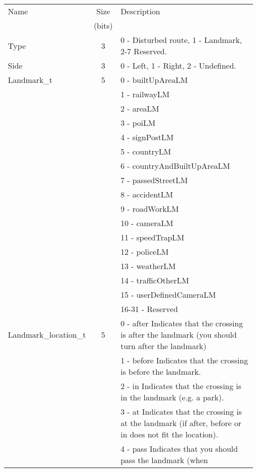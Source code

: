 \documentclass[a4paper]{article}
\begin{document}
\begin{centering}
\begin{tabular}{|l|c|p{7cm}|}
\hline
Name  & Size     & Description \\
      & (bits)   &             \\\hline
Type  & 3        & 0 - Disturbed route, 1 - Landmark, 2-7 Reserved. \\\hline
Side  & 3        & 0 - Left, 1 - Right, 2 - Undefined. \\\hline
Landmark\_t &  5 & 0 - builtUpAreaLM \\
      &          & 1 - railwayLM \\
      &          & 2 - areaLM \\
      &          & 3 - poiLM \\
      &          & 4 - signPostLM \\
      &          & 5 - countryLM \\
      &          & 6 - countryAndBuiltUpAreaLM \\
      &          & 7 -  passedStreetLM \\
      &          & 8 -  accidentLM \\
      &          & 9 - roadWorkLM \\
      &          & 10 - cameraLM \\
      &          & 11 - speedTrapLM \\
      &          & 12 - policeLM \\
      &          & 13 - weatherLM \\
      &          & 14 - trafficOtherLM \\
      &          & 15 - userDefinedCameraLM \\
      &          & 16-31 - Reserved \\\hline
Landmark\_location\_t & 5 & 0 - after Indicates that the crossing is after the
                                landmark (you  should turn after the landmark)\\
      &          & 1 - before Indicates that the crossing is before the 
                              landmark.\\
      &          & 2 - in Indicates that the crossing is in the landmark 
                          (e.g. a park).\\
      &          & 3 - at Indicates that the crossing is at the landmark (if 
                          after, before or in does not fit the location).\\
      &          & 4 - pass Indicates that you should pass the landmark (when 

\end{tabular}
\end{centering}
\end{document}
